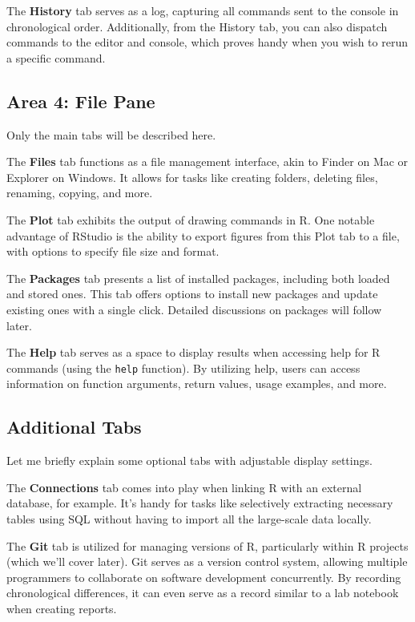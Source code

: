 \documentclass[
  a4paper,
]{book}
\begin{document}
The \textbf{History} tab serves as a log, capturing all commands sent to
the console in chronological order. Additionally, from the History tab,
you can also dispatch commands to the editor and console, which proves
handy when you wish to rerun a specific command.

\subsection{Area 4: File Pane}\label{area-4-file-pane}

Only the main tabs will be described here.

The \textbf{Files} tab functions as a file management interface, akin to
Finder on Mac or Explorer on Windows. It allows for tasks like creating
folders, deleting files, renaming, copying, and more.

The \textbf{Plot} tab exhibits the output of drawing commands in R. One
notable advantage of RStudio is the ability to export figures from this
Plot tab to a file, with options to specify file size and format.

The \textbf{Packages} tab presents a list of installed packages,
including both loaded and stored ones. This tab offers options to
install new packages and update existing ones with a single click.
Detailed discussions on packages will follow later.

The \textbf{Help} tab serves as a space to display results when
accessing help for R commands (using the \texttt{help} function). By
utilizing help, users can access information on function arguments,
return values, usage examples, and more.

\subsection{Additional Tabs}\label{additional-tabs}

Let me briefly explain some optional tabs with adjustable display
settings.

The \textbf{Connections} tab comes into play when linking R with an
external database, for example. It's handy for tasks like selectively
extracting necessary tables using SQL without having to import all the
large-scale data locally.

The \textbf{Git} tab is utilized for managing versions of R,
particularly within R projects (which we'll cover later). Git serves as
a version control system, allowing multiple programmers to collaborate
on software development concurrently. By recording chronological
differences, it can even serve as a record similar to a lab notebook
when creating reports.
\end{document}
